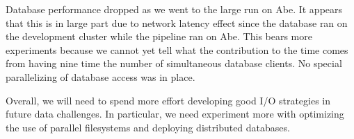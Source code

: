 Database performance dropped as we went to the large run on Abe.  It
appears that this is in large part due to network latency effect since
the database ran on the development cluster while the pipeline ran on
Abe.  This bears more experiments because we cannot yet tell what the
contribution to the time comes from having nine time the number of
simultaneous database clients.  No special parallelizing of database
access was in place.  

Overall, we will need to spend more effort developing good I/O
strategies in future data challenges.  In particular, we need
experiment more with optimizing the use of parallel filesystems and
deploying distributed databases.  


